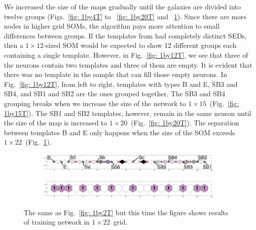             We increased the size of the maps gradually until the galaxies are divided into twelve groups (Figs.~\ref{fig: 1by4T} to ~\ref{fig: 1by20T} and ~\ref{fig: 1by22T}).
            Since there are more nodes in higher grid SOMs, the  algorithm 
            pays more attention to small differences between groups.
            If the templates from  had completely distinct SEDs, then a $1\times12$-sized SOM would be expected to show 12 different groups each containing a single template.
            However, in Fig.~\ref{fig: 1by12T}, we see that three of the neurons contain two templates and three of them are empty.
            It is evident that there was no template in the  sample that can fill those empty neurons.
            In Fig.~\ref{fig: 1by12T}, from left to right, templates with types B and E, SB3 and SB4, and SB1 and SB2 are the ones grouped together. 
            The SB3 and SB4 grouping breaks when we increase the size of the network to $1\times15$~(Fig.~\ref{fig: 1by15T}).
            The SB1 and SB2 templates, however, remain in the same neuron until the size of the map is increased to $1\times20$~(Fig.~\ref{fig: 1by20T}).
            The separation between templates B and E only happens when the size of the SOM exceeds $1\times22$~(Fig.~\ref{fig: 1by22T}).
        \begin{figure}
            \begin{subfigure}[b]{\textwidth}
                \centering
                \includegraphics[width=\textwidth]{../image_paper2/1d/dist_1_by_22.png}
            \end{subfigure}
            \hfill
            \begin{subfigure}[b]{\textwidth}
                \includegraphics[width=\textwidth]{../image_paper2/1d/hit_t_1_by_22.png}
            \end{subfigure}
            \caption{The same as Fig.~\ref{fig: 1by2T} but this time the figure shows results of training network in $1\times22$~grid.}
            \label{fig: 1by22T}
        \end{figure} 
    
